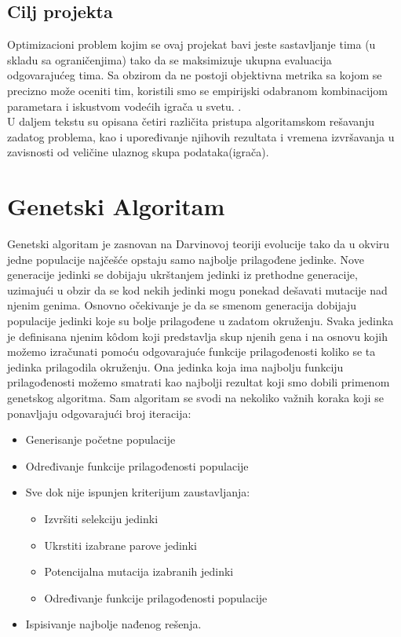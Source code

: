 \documentclass[a4paper]{article}
\begin{document}
\subsection{Cilj projekta}
\vspace{3mm}
Optimizacioni problem kojim se ovaj projekat bavi jeste sastavljanje tima (u skladu sa ograničenjima) tako da se maksimizuje ukupna evaluacija odgovarajućeg tima. Sa obzirom da ne postoji objektivna metrika sa kojom se precizno može oceniti tim, koristili smo se empirijski odabranom kombinacijom parametara i iskustvom vodećih igrača u svetu.  \cite{FPLExpert}. \\

U daljem tekstu su opisana četiri različita pristupa algoritamskom rešavanju zadatog problema, kao i upoređivanje njihovih rezultata i vremena izvršavanja u zavisnosti od veličine ulaznog skupa podataka(igrača).

\vspace{5mm} 

\section{Genetski Algoritam}
Genetski algoritam je zasnovan na Darvinovoj teoriji evolucije tako da u okviru jedne populacije najčešće opstaju samo najbolje prilagođene jedinke. Nove generacije jedinki se dobijaju ukrštanjem jedinki iz prethodne generacije, uzimajući u obzir da se kod nekih jedinki mogu ponekad dešavati mutacije nad njenim genima. Osnovno očekivanje je da se smenom generacija dobijaju populacije jedinki koje su bolje prilagođene u zadatom okruženju. Svaka jedinka je definisana njenim kôdom koji predstavlja skup njenih gena i na osnovu kojih možemo izračunati pomoću odgovarajuće funkcije prilagođenosti koliko se ta jedinka prilagodila okruženju. Ona jedinka koja ima najbolju funkciju prilagođenosti možemo smatrati kao najbolji rezultat koji smo dobili primenom genetskog algoritma. Sam algoritam se svodi na nekoliko važnih koraka koji se ponavljaju odgovarajući broj iteracija:
\begin{itemize}
  \item Generisanje početne populacije
  \item Određivanje funkcije prilagođenosti populacije
  \item Sve dok nije ispunjen kriterijum zaustavljanja:
  \begin{itemize}
	\item Izvršiti selekciju jedinki
	\item Ukrstiti izabrane parove jedinki
	\item Potencijalna mutacija izabranih jedinki
	\item Određivanje funkcije prilagođenosti populacije
  \end{itemize}
  \item Ispisivanje najbolje nađenog rešenja.
\end{itemize}
\end{document}
